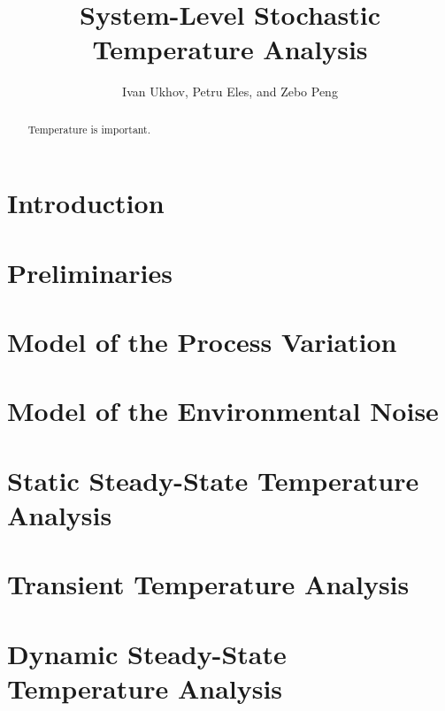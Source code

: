 \documentclass[conference]{IEEEtran}
\begin{document}
  \title{System-Level Stochastic Temperature Analysis}
  \author{Ivan Ukhov, Petru Eles, and Zebo Peng}

  \maketitle

  \begin{abstract}
    Temperature is important.
  \end{abstract}

  \section{Introduction}  
  

  \section{Preliminaries}
  

  \section{Model of the Process Variation} 
  

  \section{Model of the Environmental Noise} 
  

  \section{Static Steady-State Temperature Analysis} 
  

  \section{Transient Temperature Analysis} 
  

  \section{Dynamic Steady-State Temperature Analysis} 
  

  
  
\end{document}
